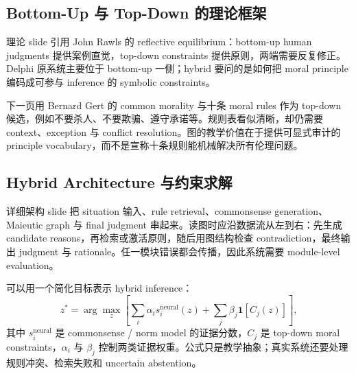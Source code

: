 
\subsection{Bottom-Up 与 Top-Down 的理论框架}

理论 slide 引用 John Rawls 的 reflective equilibrium：bottom-up human judgments 提供案例直觉，top-down constraints 提供原则，两端需要反复修正。Delphi 原系统主要位于 bottom-up 一侧；hybrid 要问的是如何把 moral principle 编码成可参与 inference 的 symbolic constraints。


下一页用 Bernard Gert 的 common morality 与十条 moral rules 作为 top-down 候选，例如不要杀人、不要欺骗、遵守承诺等。规则表看似清晰，却仍需要 context、exception 与 conflict resolution。图的教学价值在于提供可显式审计的 principle vocabulary，而不是宣称十条规则能机械解决所有伦理问题。


\subsection{Hybrid Architecture 与约束求解}

详细架构 slide 把 situation 输入、rule retrieval、commonsense generation、Maieutic graph 与 final judgment 串起来。读图时应沿数据流从左到右：先生成 candidate reasons，再检索或激活原则，随后用图结构检查 contradiction，最终输出 judgment 与 rationale。任一模块错误都会传播，因此系统需要 module-level evaluation。


可以用一个简化目标表示 hybrid inference：
\begin{equation}
z^*=\arg\max_z
\left[
\sum_i \alpha_i s_i^{\mathrm{neural}}(z)
+\sum_j \beta_j\mathbf{1}[C_j(z)]
\right],
\end{equation}
其中 $s_i^{\mathrm{neural}}$ 是 commonsense / norm model 的证据分数，$C_j$ 是 top-down moral constraints，$\alpha_i$ 与 $\beta_j$ 控制两类证据权重。公式只是教学抽象；真实系统还要处理规则冲突、检索失败和 uncertain abstention。

